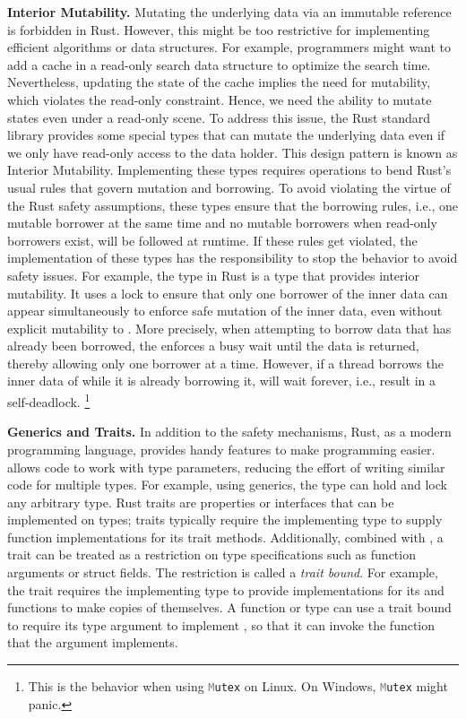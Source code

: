 \textbf{Interior Mutability.}
Mutating the underlying data via an immutable reference
is forbidden in Rust.
However, this might be too restrictive for
implementing efficient algorithms or data structures.
For example, programmers might want to add a cache
in a read-only search data structure
to optimize the search time.
Nevertheless, updating the state of the cache implies
the need for mutability,
which violates the read-only constraint.
Hence, we need the ability to mutate states even under a read-only scene.
To address this issue,
the Rust standard library provides some special types
that can mutate the underlying data
even if we only have read-only access to the data holder.
This design pattern is known as Interior Mutability.
Implementing these types requires  operations
to bend Rust's usual rules that govern mutation and borrowing.
To avoid violating the virtue of the Rust safety assumptions,
these types ensure that the borrowing rules,
i.e., one mutable borrower at the same time
and no mutable borrowers when read-only borrowers exist,
will be followed at runtime.
If these rules get violated,
the implementation of these types has the responsibility
to stop the behavior to avoid safety issues.
For example, the type  in Rust is a type that provides
interior mutability.
It uses a lock to ensure that
only one borrower of the inner data can appear simultaneously
to enforce safe mutation of the inner data, even without explicit mutability to .
More precisely, when attempting to borrow data that has already been borrowed,
the  enforces a busy wait until the data is returned,
thereby allowing only one borrower at a time.
However, if a thread borrows the inner data of  while it is already borrowing it,
 will wait forever, i.e., result in a self-deadlock.
\footnote{This is the behavior when using \texttt{\textcolor{gray}Mutex} on Linux.
On Windows, \texttt{\textcolor{gray}Mutex} might panic.}

\textbf{Generics and Traits.}
In addition to the safety mechanisms, Rust, as a modern programming language,
provides handy features to make programming easier.
 allows code to work with type parameters,
reducing the effort of writing similar code for multiple types.
For example, using generics, the  type can
hold and lock any arbitrary type.
Rust traits are properties or interfaces that can be implemented on types; traits typically require the implementing type
to supply function implementations for its trait methods.
Additionally, combined with ,
a trait can be treated as a restriction on type specifications such as function arguments or struct fields.
The restriction is called a \textit{trait bound}.
For example, the  trait requires the implementing type
to provide implementations for its  and  functions
to make copies of themselves.
A  function or type can use a trait bound to
require its type argument to implement ,
so that it can invoke the  function that the argument implements.

